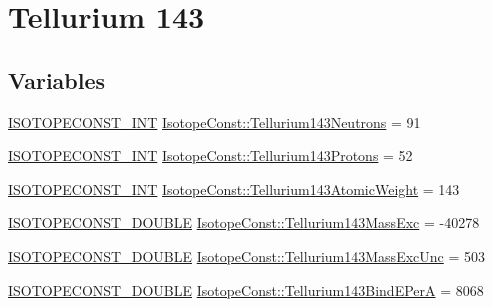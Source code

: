 \hypertarget{group___isotope_const-_tellurium-_te143}{}\section{Tellurium 143}
\label{group___isotope_const-_tellurium-_te143}
\subsection*{Variables}
\begin{DoxyCompactItemize}
\item 
\mbox{\hyperlink{group___isotope_const-_macros_ga5f18360b3e99483a35c32d789e62621c}{I\+S\+O\+T\+O\+P\+E\+C\+O\+N\+S\+T\+\_\+\+I\+NT}} \mbox{\hyperlink{group___isotope_const-_tellurium-_te143_gafe8ad60ea77015ab1e0894facbaba9d2}{Isotope\+Const\+::\+Tellurium143\+Neutrons}} = 91
\item 
\mbox{\hyperlink{group___isotope_const-_macros_ga5f18360b3e99483a35c32d789e62621c}{I\+S\+O\+T\+O\+P\+E\+C\+O\+N\+S\+T\+\_\+\+I\+NT}} \mbox{\hyperlink{group___isotope_const-_tellurium-_te143_ga670380dc46cf99bc2d3380f3e36ab939}{Isotope\+Const\+::\+Tellurium143\+Protons}} = 52
\item 
\mbox{\hyperlink{group___isotope_const-_macros_ga5f18360b3e99483a35c32d789e62621c}{I\+S\+O\+T\+O\+P\+E\+C\+O\+N\+S\+T\+\_\+\+I\+NT}} \mbox{\hyperlink{group___isotope_const-_tellurium-_te143_gab4c74eeec130a31a7ee6587a61f4ee6c}{Isotope\+Const\+::\+Tellurium143\+Atomic\+Weight}} = 143
\item 
\mbox{\hyperlink{group___isotope_const-_macros_ga8f45a7272ce02c0b4c65c44636ed719a}{I\+S\+O\+T\+O\+P\+E\+C\+O\+N\+S\+T\+\_\+\+D\+O\+U\+B\+LE}} \mbox{\hyperlink{group___isotope_const-_tellurium-_te143_gad96fb70d42b9d9d9e624e1611a4993e9}{Isotope\+Const\+::\+Tellurium143\+Mass\+Exc}} = -\/40278
\item 
\mbox{\hyperlink{group___isotope_const-_macros_ga8f45a7272ce02c0b4c65c44636ed719a}{I\+S\+O\+T\+O\+P\+E\+C\+O\+N\+S\+T\+\_\+\+D\+O\+U\+B\+LE}} \mbox{\hyperlink{group___isotope_const-_tellurium-_te143_ga83d027075d538cbe3081bcff3b2adea4}{Isotope\+Const\+::\+Tellurium143\+Mass\+Exc\+Unc}} = 503
\item 
\mbox{\hyperlink{group___isotope_const-_macros_ga8f45a7272ce02c0b4c65c44636ed719a}{I\+S\+O\+T\+O\+P\+E\+C\+O\+N\+S\+T\+\_\+\+D\+O\+U\+B\+LE}} \mbox{\hyperlink{group___isotope_const-_tellurium-_te143_ga01dbb2d27ef5319a2cf22df618224dcb}{Isotope\+Const\+::\+Tellurium143\+Bind\+E\+PerA}} = 8068
\item 

\end{DoxyCompactItemize}
